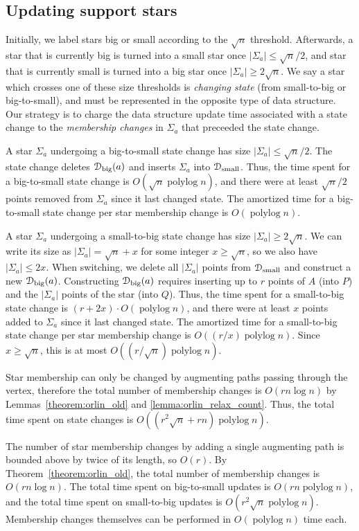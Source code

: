 \documentclass[a4paper,UKenglish]{socg-lipics-v2018}
\def\polylog{\mathop{\mathrm{polylog}}}
\def\abs#1{\mathopen| #1 \mathclose|}		%
\theoremstyle{plain}
\numberwithin{figure}{section}
\def\EMPH#1{\textcolor{BrickRed}{{\emph{#1}}}}
\begin{document}
\begin{toappendix}
\subsection{Updating support stars}
\label{SSA:update-support-star}

Initially, we label stars big or small according to the $\sqrt{n}$ threshold.
Afterwards, a star that is currently big is turned into a small star once
$\abs{\Sigma_a} \leq \sqrt{n}/2$, and star that is currently small is turned
into a big star once $\abs{\Sigma_a} \geq 2\sqrt{n}$.
We say a star which crosses one of these size thresholds is \EMPH{changing state}
(from small-to-big or big-to-small), and must be represented in the opposite
type of data structure.
Our strategy is to charge the data structure update time associated with a
state change to the \EMPH{membership changes} in $\Sigma_a$ that preceeded the
state change.

A star $\Sigma_a$ undergoing a big-to-small state change has size
$\abs{\Sigma_a} \leq \sqrt{n}/2$.
The state change deletes $\EuScript{D}_\text{big}(a)$ and inserts $\Sigma_a$
into $\EuScript{D}_\text{small}$.
Thus, the time spent for a big-to-small state change is $O(\sqrt{n}\polylog n)$,
and there were at least $\sqrt{n}/2$ points removed from $\Sigma_a$ since it
last changed state.
The amortized time for a big-to-small state change per star membership change
is $O(\polylog n)$.

A star $\Sigma_a$ undergoing a small-to-big state change has size
$\abs{\Sigma_a} \geq 2\sqrt{n}$.
We can write its size as $\abs{\Sigma_a} = \sqrt{n} + x$ for some integer
$x \geq \sqrt{n}$, so we also have $\abs{\Sigma_a} \leq 2x$.
When switching, we delete all $\abs{\Sigma_a}$ points from
$\EuScript{D}_\text{small}$ and construct a new $\EuScript{D}_\text{big}(a)$.
Constructing $\EuScript{D}_\text{big}(a)$ requires inserting up to $r$ points
of $A$ (into $P$) and the $\abs{\Sigma_a}$ points of the star (into $Q$).
Thus, the time spent for a small-to-big state change is $(r + 2x) \cdot O(\polylog n)$,
and there were at least $x$ points added to $\Sigma_a$ since it last changed state.
The amortized time for a small-to-big state change per star membership change
is $O((r/x)\polylog n)$.
Since $x \geq \sqrt{n}$, this is at most $O((r/\sqrt{n})\polylog n)$.

Star membership can only be changed by augmenting paths passing through the
vertex, therefore the total number of membership changes is $O(rn\log n)$
by Lemmas~\ref{theorem:orlin_old} and \ref{lemma:orlin_relax_count}.
Thus, the total time spent on state changes is $O((r^2\sqrt{n} + rn)\polylog n)$.

\end{toappendix}
%
The number of star membership changes by adding a single augmenting path is
bounded above by twice of its length, so $O(r)$.
By Theorem~\ref{theorem:orlin_old}, the total number of membership changes is $O(rn\log n)$.
The total time spent on big-to-small updates is $O(rn\polylog n)$, and the
total time spent on small-to-big updates is $O(r^2\sqrt{n}\polylog n)$.
Membership changes themselves can be performed in $O(\polylog n)$ time each.
\end{document}
